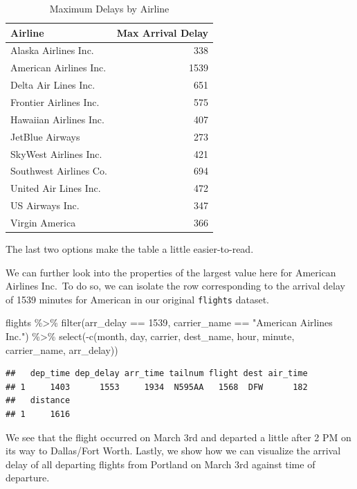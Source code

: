 \documentclass[print]{nuthesis}
\newenvironment{Shaded}{\begin{snugshade}}{\end{snugshade}}
\newcommand{\DecValTok}[1]{\textcolor[rgb]{0.00,0.00,0.81}{#1}}
\newcommand{\FunctionTok}[1]{\textcolor[rgb]{0.00,0.00,0.00}{#1}}
\newcommand{\NormalTok}[1]{#1}
\newcommand{\SpecialCharTok}[1]{\textcolor[rgb]{0.00,0.00,0.00}{#1}}
\newcommand{\StringTok}[1]{\textcolor[rgb]{0.31,0.60,0.02}{#1}}
\begin{document}
\begin{longtable}[t]{lr}
\caption[Max Delays by Airline]{\label{tab:maxdelays}Maximum Delays by Airline}\\
\toprule
Airline & Max Arrival Delay\\
\midrule
Alaska Airlines Inc. & 338\\
American Airlines Inc. & 1539\\
Delta Air Lines Inc. & 651\\
Frontier Airlines Inc. & 575\\
Hawaiian Airlines Inc. & 407\\
\addlinespace
JetBlue Airways & 273\\
SkyWest Airlines Inc. & 421\\
Southwest Airlines Co. & 694\\
United Air Lines Inc. & 472\\
US Airways Inc. & 347\\
\addlinespace
Virgin America & 366\\
\bottomrule
\end{longtable}

The last two options make the table a little easier-to-read.

We can further look into the properties of the largest value here for American Airlines Inc.~To do so, we can isolate the row corresponding to the arrival delay of 1539 minutes for American in our original \texttt{flights} dataset.

\begin{Shaded}
\begin{Highlighting}[]
\NormalTok{flights }\SpecialCharTok{\%\textgreater{}\%} \FunctionTok{filter}\NormalTok{(arr\_delay }\SpecialCharTok{==} \DecValTok{1539}\NormalTok{, carrier\_name }\SpecialCharTok{==} 
    \StringTok{"American Airlines Inc."}\NormalTok{) }\SpecialCharTok{\%\textgreater{}\%} \FunctionTok{select}\NormalTok{(}\SpecialCharTok{{-}}\FunctionTok{c}\NormalTok{(month, }
\NormalTok{    day, carrier, dest\_name, hour, minute, carrier\_name, }
\NormalTok{    arr\_delay))}
\end{Highlighting}
\end{Shaded}

\begin{verbatim}
##   dep_time dep_delay arr_time tailnum flight dest air_time
## 1     1403      1553     1934  N595AA   1568  DFW      182
##   distance
## 1     1616
\end{verbatim}

We see that the flight occurred on March 3rd and departed a little after 2 PM on its way to Dallas/Fort Worth. Lastly, we show how we can visualize the arrival delay of all departing flights from Portland on March 3rd against time of departure.
\end{document}
